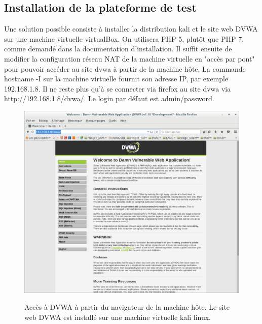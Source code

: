 \subsection*{Installation de la plateforme de test}
Une solution possible consiste à installer la distribution kali et le site web DVWA sur une machine virtuelle virtualBox. On utilisera PHP 5, plutôt que PHP 7, comme demandé dans la documentation d'installation.
Il suffit ensuite de modifier la configuration réseau NAT de la machine virtuelle en "accès par pont" pour pouvoir accéder au site dvwa à partir de la machine hôte.
La commande hostname -I sur la machine virtuelle fournit son adresse IP, par exemple 192.168.1.8. Il ne reste plus qu'à se connecter via firefox
au site dvwa via {\color{blue}http://192.168.1.8/dvwa/}. Le login par défaut est admin/password.

 \begin{figure}[!h]
 	\begin{center}
 		\label{}
 		\includegraphics[scale=\scaledvwa]{images/dvwa.png}
 		\caption{Accès à DVWA à partir du navigateur de la machine hôte. Le site web DVWA est installé sur une machine virtuelle kali linux.}
 	\end{center}
 \end{figure}


\newpage